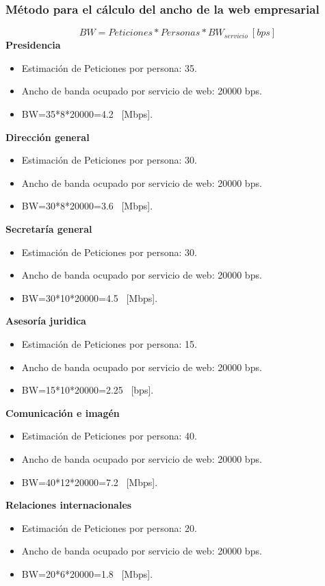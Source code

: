 \documentclass[12pt,letterpaper]{article}
\begin{document}
\subsubsection{Método para el cálculo del ancho de la web empresarial}
\begin{equation}
    BW=Peticiones*Personas*BW_{servicio} \ [bps]
\end{equation}
\textbf{Presidencia}
\begin{itemize}
    \item Estimación de Peticiones por persona: 35. 
    \item Ancho de banda ocupado por servicio de web: 20000 bps.
    \item BW=35*8*20000=4.2 \ [Mbps].
\end{itemize}
\textbf{Dirección general}
\begin{itemize}
    \item Estimación de Peticiones por persona: 30. 
    \item Ancho de banda ocupado por servicio de web: 20000 bps.
    \item BW=30*8*20000=3.6 \ [Mbps].
\end{itemize}
\textbf{Secretaría general}
\begin{itemize}
    \item Estimación de Peticiones por persona: 30. 
    \item Ancho de banda ocupado por servicio de web: 20000 bps.
    \item BW=30*10*20000=4.5 \ [Mbps].
\end{itemize}
\textbf{Asesoría juridica}
\begin{itemize}
    \item Estimación de Peticiones por persona: 15. 
    \item Ancho de banda ocupado por servicio de web: 20000 bps.
    \item BW=15*10*20000=2.25 \ [bps].
\end{itemize}
\textbf{Comunicación e imagén}
\begin{itemize}
    \item Estimación de Peticiones por persona: 40. 
    \item Ancho de banda ocupado por servicio de web: 20000 bps.
    \item BW=40*12*20000=7.2 \ [Mbps].
\end{itemize}
\textbf{Relaciones internacionales}
\begin{itemize}
    \item Estimación de Peticiones por persona: 20. 
    \item Ancho de banda ocupado por servicio de web: 20000 bps.
    \item BW=20*6*20000=1.8 \ [Mbps].
\end{itemize}
\end{document}
